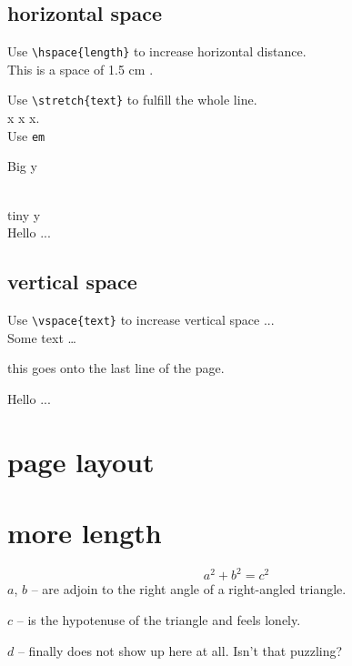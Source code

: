 \documentclass[a4paper,12pt,titlepage]{article}
\begin{document}
\subsection{horizontal space}
Use \verb|\hspace{length}| to increase horizontal distance.\\
{
This \hspace{1.5cm} is a space of 1.5 cm .
}

Use \verb|\stretch{text}| to fulfill the whole line.\\
x  x  x. \\

Use \verb|em|\\
{\Large{} \par Big \hspace{1em} y} \\
{\tiny{} tiny \hspace{1em} y} \\

Hello ...

\subsection{vertical space}
Use \verb|\vspace{text}| to increase vertical space ...\\
Some text \ldots

this goes onto the last line of the page. \pagebreak

Hello ...

\section{page layout}

\section{more length}
\flushleft
\newenvironment{vardesc}[1] %
					{\settowidth{\parindent}{#1:\ } %
					\makebox[0pt][r]{#1:\ }}{}

\begin{displaymath}
a^2 + b^2 = c^2
\end{displaymath}
\begin{vardesc}{Where}$a$,
$b$ -- are adjoin to the right angle of a right-angled triangle.

$c$ -- is the hypotenuse of the triangle and feels lonely.

$d$ -- finally does not show up here at all. Isn't that puzzling?
\end{vardesc}
\end{document}
